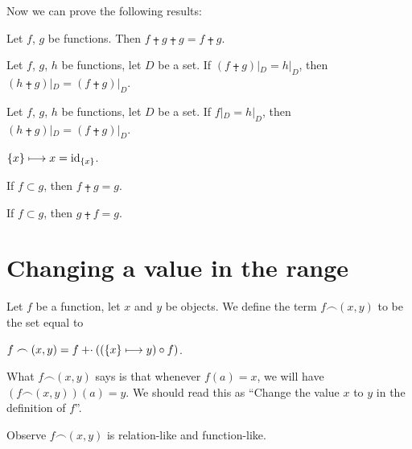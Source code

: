 \documentclass{article}
\begin{document}
Now we can prove the following results:
\begin{thm}
\item\label{funct4:93} Let $f$, $g$ be functions.
  Then $f\plusdot g\plusdot g=f\plusdot g$.
\item\label{funct4:94} Let $f$, $g$, $h$ be functions, let $D$ be a set.
  If $(f\plusdot g)|_{D}=h|_{D}$, then $(h\plusdot g)|_{D}=(f\plusdot g)|_{D}$.
\item\label{funct4:95} Let $f$, $g$, $h$ be functions, let $D$ be a set.
  If $f|_{D}=h|_{D}$, then $(h\plusdot g)|_{D}=(f\plusdot g)|_{D}$.
\item\label{funct4:96} $\{x\}\longmapsto x=\operatorname{id}_{\{x\}}$.
\item\label{funct4:97} If $f\subset g$, then $f\plusdot g=g$.
\item\label{funct4:98} If $f\subset g$, then $g\plusdot f=g$.
\end{thm}

\section{Changing a value in the range}

\begin{definition}
Let $f$ be a function, let $x$ and $y$ be objects.
We define the term $f\frown(x,y)$ to be the set equal to
\begin{defn}
\item $f\frown(x,y) = f\mathbin{\mathord{+}\cdot}((\{x\}\longmapsto y)\circ f)$.
\end{defn}
\end{definition}

\begin{remark}
What $f\frown(x,y)$ says is that whenever $f(a)=x$, we will have
$(f\frown(x,y))(a)=y$. We should read this as ``Change the value $x$ to
$y$ in the definition of $f$''.
\end{remark}

Observe $f\frown(x,y)$ is relation-like and function-like.
\end{document}
